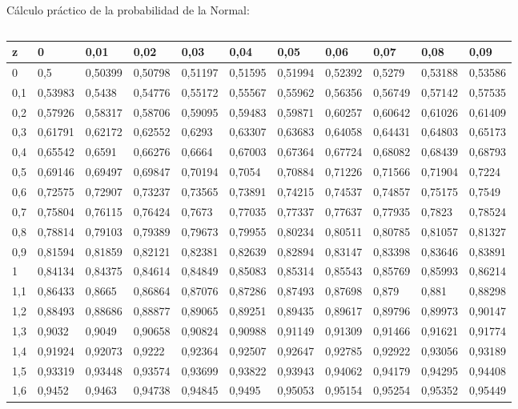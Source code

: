 \documentclass[11pt,handout]{beamer}
\begin{document}
\begin{frame}{Cálculo práctico de la probabilidad de la Normal:}
\begin{columns}
\begin{column}{0.4\textwidth}
{\begin{tabular}{l|llllllllll}
z   & 0       & 0,01    & 0,02    & 0,03    & 0,04    & 0,05    & 0,06    & 0,07    & 0,08    & 0,09    \\
\hline
0   & 0,5     & 0,50399 & 0,50798 & 0,51197 & 0,51595 & 0,51994 & 0,52392 & 0,5279  & 0,53188 & 0,53586 \\
0,1 & 0,53983 & 0,5438  & 0,54776 & 0,55172 & 0,55567 & 0,55962 & 0,56356 & 0,56749 & 0,57142 & 0,57535 \\
0,2 & 0,57926 & 0,58317 & 0,58706 & 0,59095 & 0,59483 & 0,59871 & 0,60257 & 0,60642 & 0,61026 & 0,61409 \\
0,3 & 0,61791 & 0,62172 & 0,62552 & 0,6293  & 0,63307 & 0,63683 & 0,64058 & 0,64431 & 0,64803 & 0,65173 \\
0,4 & 0,65542 & 0,6591  & 0,66276 & 0,6664  & 0,67003 & 0,67364 & 0,67724 & 0,68082 & 0,68439 & 0,68793 \\
0,5 & 0,69146 & 0,69497 & 0,69847 & 0,70194 & 0,7054  & 0,70884 & 0,71226 & 0,71566 & 0,71904 & 0,7224  \\
0,6 & 0,72575 & 0,72907 & 0,73237 & 0,73565 & 0,73891 & 0,74215 & 0,74537 & 0,74857 & 0,75175 & 0,7549  \\
0,7 & 0,75804 & 0,76115 & 0,76424 & 0,7673  & 0,77035 & 0,77337 & 0,77637 & 0,77935 & 0,7823  & 0,78524 \\
0,8 & 0,78814 & 0,79103 & 0,79389 & 0,79673 & 0,79955 & 0,80234 & 0,80511 & 0,80785 & 0,81057 & 0,81327 \\
0,9 & 0,81594 & 0,81859 & 0,82121 & 0,82381 & 0,82639 & 0,82894 & 0,83147 & 0,83398 & 0,83646 & 0,83891 \\
1   & 0,84134 & 0,84375 & 0,84614 & 0,84849 & 0,85083 & 0,85314 & 0,85543 & 0,85769 & 0,85993 & 0,86214 \\
1,1 & 0,86433 & 0,8665  & 0,86864 & 0,87076 & 0,87286 & 0,87493 & 0,87698 & 0,879   & 0,881   & 0,88298 \\
1,2 & 0,88493 & 0,88686 & 0,88877 & 0,89065 & 0,89251 & 0,89435 & 0,89617 & 0,89796 & 0,89973 & 0,90147 \\
1,3 & 0,9032  & 0,9049  & 0,90658 & 0,90824 & 0,90988 & 0,91149 & 0,91309 & 0,91466 & 0,91621 & 0,91774 \\
1,4 & 0,91924 & 0,92073 & 0,9222  & 0,92364 & 0,92507 & 0,92647 & 0,92785 & 0,92922 & 0,93056 & 0,93189 \\
1,5 & 0,93319 & 0,93448 & 0,93574 & 0,93699 & 0,93822 & 0,93943 & 0,94062 & 0,94179 & 0,94295 & 0,94408 \\
1,6 & 0,9452  & 0,9463  & 0,94738 & 0,94845 & 0,9495  & 0,95053 & 0,95154 & 0,95254 & 0,95352 & 0,95449 \\

\end{tabular}}
\end{column}
\end{columns}
\end{frame}
\end{document}
